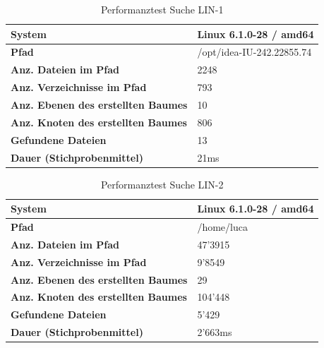 \documentclass[a4paper,12pt]{report}
\begin{document}
    \begin{table}[h!]
        \centering
        \setlength{\leftmargini}{0.8cm}
        \begin{tabular}{|p{7cm}|p{5cm}|}
            \hline
            \textbf{System}                                     & Linux 6.1.0-28 / amd64    \\ \hline
            \textbf{Pfad}                                       & /opt/idea-IU-242.22855.74 \\ \hline
            \textbf{Anz. Dateien im Pfad}                       & 2248                      \\ \hline
            \textbf{Anz. Verzeichnisse im Pfad}                 & 793                       \\ \hline
            \textbf{Anz. Ebenen \newline des erstellten Baumes} & 10                        \\ \hline
            \textbf{Anz. Knoten \newline des erstellten Baumes} & 806                       \\ \hline
            \textbf{Gefundene Dateien}                          & 13                        \\ \hline
            \textbf{Dauer (Stichprobenmittel)}                  & 21ms                      \\ \hline
        \end{tabular}
        \caption{Performanztest Suche LIN-1}\label{tab:perf-search-lin-1}
    \end{table}

    \begin{table}[h!]
        \centering
        \setlength{\leftmargini}{0.8cm}
        \begin{tabular}{|p{7cm}|p{5cm}|}
            \hline
            \textbf{System}                                     & Linux 6.1.0-28 / amd64 \\ \hline
            \textbf{Pfad}                                       & /home/luca             \\ \hline
            \textbf{Anz. Dateien im Pfad}                       & 47'3915                \\ \hline
            \textbf{Anz. Verzeichnisse im Pfad}                 & 9'8549                 \\ \hline
            \textbf{Anz. Ebenen \newline des erstellten Baumes} & 29                     \\ \hline
            \textbf{Anz. Knoten \newline des erstellten Baumes} & 104'448                \\ \hline
            \textbf{Gefundene Dateien}                          & 5'429                  \\ \hline
            \textbf{Dauer (Stichprobenmittel)}                  & 2'663ms                \\ \hline
        \end{tabular}
        \caption{Performanztest Suche LIN-2}\label{tab:perf-search-lin-2}
    \end{table}
\end{document}
